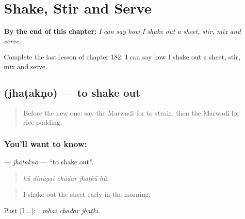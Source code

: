 
\chapter{Shake, Stir and Serve}
\label{ch:mw-shake-stir-and-serve}

\begin{chapteropening}
\textbf{By the end of this chapter:} \emph{I can say how I shake out a sheet, stir, mix and serve.}

Complete the last lesson of chapter 182: I can say how I shake out a sheet, stir, mix and serve.
\end{chapteropening}

\section[\texorpdfstring{\mw{झटकणो} (jhaṭakṇo)}{झटकणो (jhaṭakṇo)}]{ (jhaṭakṇo) — to shake out}

\label{lesson:MW-C182-jhatakno}



\begin{quote}
Before the new one: say the Marwadi for to strain, then the Marwadi for rice pudding.
\end{quote}

\subsection*{You'll want to know: }
\textbf{} — \emph{jhaṭakṇo} — \textquotedblleft{}to shake out\textquotedblright{}.

\begin{quote}
    
\end{quote}

\begin{quote}
\emph{hū̃ dinūgai chādar jhaṭkū̃ hū̃.}
\end{quote}

\begin{quote}
I shake out the sheet early in the morning.
\end{quote}

Past (I …):   , \emph{mhaĩ chādar jhaṭkī}.

